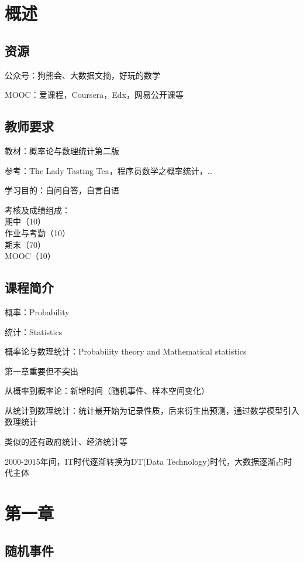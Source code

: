 \section*{概述}%
\label{sec:概述}
\subsection*{资源}%
\label{sub:资源}
公众号：狗熊会、大数据文摘，好玩的数学

MOOC：爱课程，Coursera，Edx，网易公开课等

\subsection*{教师要求}%
\label{sub:教师要求}

教材：概率论与数理统计第二版

参考：The Lady Tasting Tea，程序员数学之概率统计，\ldots

学习目的：自问自答，自言自语

考核及成绩组成：\\期中（10）\\作业与考勤（10）\\期末（70）\\MOOC（10）

\subsection*{课程简介}%
\label{sub:课程简介}
概率：Probability

统计：Statistics

概率论与数理统计：Probability theory and Mathematical statistics

\begin{notation}
第一章重要但不突出
\end{notation}
从概率到概率论：新增时间（随机事件、样本空间变化）

从统计到数理统计：统计最开始为记录性质，后来衍生出预测，通过数学模型引入数理统计

类似的还有政府统计、经济统计等

2000-2015年间，IT时代逐渐转换为DT(Data Technology)时代，大数据逐渐占时代主体
\section{第一章}%
\label{sec:第一章}

\subsection{随机事件}%
\label{sub:随机事件}

